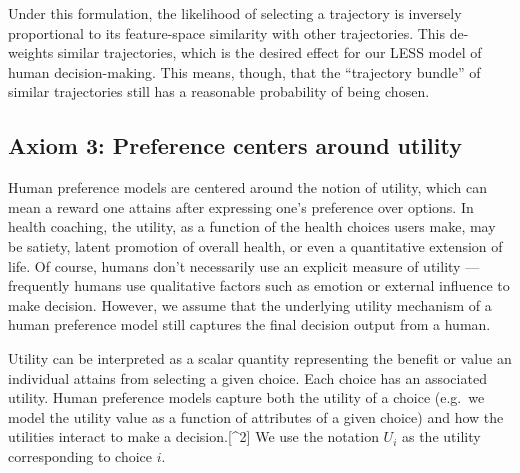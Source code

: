 \documentclass[
  letterpaper,
  numbers=noenddot,
  DIV=11,
  oneside]{scrreprt}
\theoremstyle{remark}
\begin{document}
Under this formulation, the likelihood of selecting a trajectory is
inversely proportional to its feature-space similarity with other
trajectories. This de-weights similar trajectories, which is the desired
effect for our LESS model of human decision-making. This means, though,
that the ``trajectory bundle'' of similar trajectories still has a
reasonable probability of being chosen.

\subsection*{Axiom 3: Preference centers around
utility}\label{axiom-3-preference-centers-around-utility}

Human preference models are centered around the notion of utility, which
can mean a reward one attains after expressing one's preference over
options. In health
coaching, the utility, as a function of the health choices users make,
may be satiety, latent promotion of overall health, or even a
quantitative extension of life. Of course, humans don't necessarily use
an explicit measure of utility --- frequently humans use qualitative
factors such as emotion or external influence to make decision. However,
we assume that the underlying utility mechanism of a human preference
model still captures the final decision output from a human.

Utility can be interpreted as a scalar quantity representing the benefit
or value an individual attains from selecting a given choice. Each
choice has an associated utility. Human preference models capture both
the utility of a choice (e.g.~we model the utility value as a function
of attributes of a given choice) and how the utilities interact to make
a decision.{[}\^{}2{]} We use the notation \(U_i\) as the utility
corresponding to choice \(i\).
\end{document}
